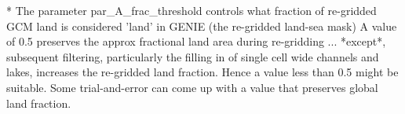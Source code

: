 \documentclass[11pt,fleqn]{book} %
\begin{document}
* The parameter 
  par\_A\_frac\_threshold
  controls what fraction of re-gridded GCM land is considered 'land' in GENIE (the re-gridded land-sea mask)
  A value of 0.5 preserves the approx fractional land area during re-gridding ...
  *except*, subsequent filtering, particularly the filling in of single cell wide channels and lakes,
  increases the re-gridded land fraction. Hence a value less than 0.5 might be suitable.
  Some trial-and-error can come up with a value that preserves global land fraction.




\cleardoublepage
{}
\setlength{\columnsep}{0.75cm}
\printindex

\end{document}
